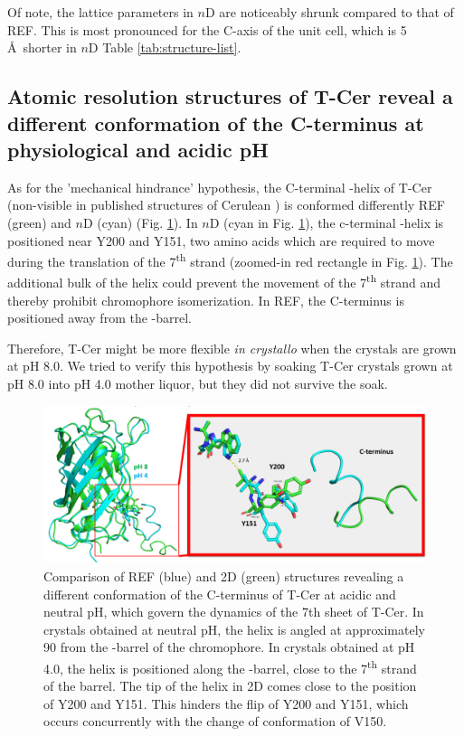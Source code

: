 Of note, the lattice parameters in \(n\)D are noticeably shrunk compared to that of REF. This is most pronounced for the C-axis of the unit cell, which is 5 \AA\ shorter in \(n\)D Table \ref{tab:structure-list}. 

\subsection{Atomic resolution structures of T-Cer reveal a different conformation of the C-terminus at physiological and acidic pH}

As for the 'mechanical hindrance' hypothesis, the C-terminal \textalpha-helix of T-Cer (non-visible in published structures of Cerulean \parencite{maloXrayStructureCerulean2007, gotthardCapturingBluelightActivated2023}) is conformed differently REF (green) and \(n\)D (cyan) (Fig. \ref{fig:T_Cer_cter}). In \(n\)D (cyan in Fig. \ref{fig:T_Cer_cter}), the c-terminal \textalpha-helix is positioned near Y200 and Y151, two amino acids which are required to move during the translation of the 7\textsuperscript{th} strand (zoomed-in red rectangle in Fig. \ref{fig:T_Cer_cter}). The additional bulk of the helix could prevent the movement of the 7\textsuperscript{th} strand and thereby prohibit chromophore isomerization. In REF, the C-terminus is positioned away from the \textbeta-barrel. 

\vspace{2mm}

Therefore, T-Cer might be more flexible \textit{in crystallo} when the crystals are grown at pH 8.0. We tried to verify this hypothesis by soaking T-Cer crystals grown at pH 8.0 into pH 4.0 mother liquor, but they did not survive the soak. 

\begin{figure}[H] %
    \centering
        \noindent \includegraphics[width=\textwidth]{images/T-Cer/C-ter_T-Cer.pdf}
    \hfill
    \caption{Comparison of REF (blue) and 2D (green) structures revealing a different conformation of the C-terminus of T-Cer at acidic and neutral pH, which govern the dynamics of the 7th \textbeta sheet of T-Cer. In crystals obtained at neutral pH, the helix is angled at approximately 90 \degree from the \textbeta-barrel of the chromophore. In crystals obtained at pH 4.0, the helix is positioned along the \textbeta-barrel, close to the 7\textsuperscript{th} strand of the barrel. The tip of the helix in 2D comes close to the position of Y200 and Y151. This hinders the flip of Y200 and Y151, which occurs concurrently with the change of conformation of V150.}
    \label{fig:T_Cer_cter}
\end{figure}

